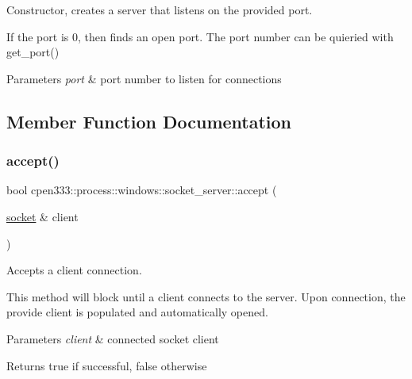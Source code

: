 Constructor, creates a server that listens on the provided port. 

If the port is 0, then finds an open port. The port number can be quieried with get\+\_\+port()


\begin{DoxyParams}{Parameters}
{\em port} & port number to listen for connections \\
\hline
\end{DoxyParams}


\subsection{Member Function Documentation}
\mbox{\label{classcpen333_1_1process_1_1windows_1_1socket__server_a9faaa8159f63116a3fa5e7a68ca8095a}} 
\subsubsection{\texorpdfstring{accept()}{accept()}}
{\footnotesize\ttfamily bool cpen333\+::process\+::windows\+::socket\+\_\+server\+::accept (\begin{DoxyParamCaption}\item[{\hyperlink{classcpen333_1_1process_1_1windows_1_1socket}{socket} \&}]{client }\end{DoxyParamCaption})\hspace{0.3cm}{\ttfamily [inline]}}



Accepts a client connection. 

This method will block until a client connects to the server. Upon connection, the provide client is populated and automatically opened.


\begin{DoxyParams}{Parameters}
{\em client} & connected socket client \\
\hline
\end{DoxyParams}
\begin{DoxyReturn}{Returns}
true if successful, false otherwise 
\end{DoxyReturn}
\mbox{\label{classcpen333_1_1process_1_1windows_1_1socket__server_ad4f6bbc14fc0f8716feea2a120873b50}} 
